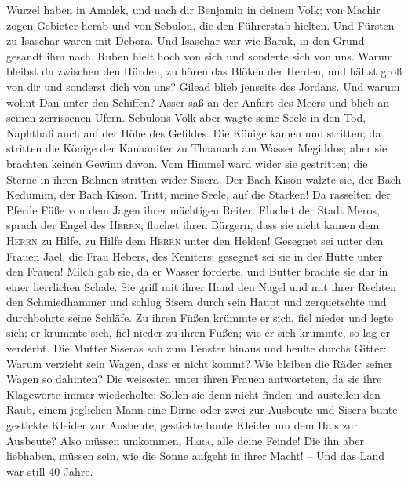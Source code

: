 Wurzel haben in Amalek, und nach dir Benjamin in deinem Volk; von Machir
zogen Gebieter herab und von Sebulon, die den Führerstab hielten.
 Und Fürsten zu Isaschar waren mit Debora. Und Isaschar
war wie Barak, in den Grund gesandt ihm nach. Ruben hielt hoch von sich
und sonderte sich von uns.  Warum bleibst du zwischen den
Hürden, zu hören das Blöken der Herden, und hältst groß von dir und
sonderst dich von uns?  Gilead blieb jenseits des
Jordans. Und warum wohnt Dan unter den Schiffen? Asser saß an der Anfurt
des Meers und blieb an seinen zerrissenen Ufern. 
Sebulons Volk aber wagte seine Seele in den Tod, Naphthali auch auf der
Höhe des Gefildes.  Die Könige kamen und stritten; da
stritten die Könige der Kanaaniter zu Thaanach am Wasser Megiddos; aber
sie brachten keinen Gewinn davon.  Vom Himmel ward wider
sie gestritten; die Sterne in ihren Bahnen stritten wider Sisera.
 Der Bach Kison wälzte sie, der Bach Kedumim, der Bach
Kison. Tritt, meine Seele, auf die Starken!  Da rasselten
der Pferde Füße von dem Jagen ihrer mächtigen Reiter. 
Fluchet der Stadt Meros, sprach der Engel des \textsc{Herrn}; fluchet
ihren Bürgern, dass sie nicht kamen dem \textsc{Herrn} zu Hilfe, zu
Hilfe dem \textsc{Herrn} unter den Helden!  Gesegnet sei
unter den Frauen Jael, die Frau Hebers, des Keniters; gesegnet sei sie
in der Hütte unter den Frauen!  Milch gab sie, da er
Wasser forderte, und Butter brachte sie dar in einer herrlichen Schale.
 Sie griff mit ihrer Hand den Nagel und mit ihrer Rechten
den Schmiedhammer und schlug Sisera durch sein Haupt und zerquetschte
und durchbohrte seine Schläfe.  Zu ihren Füßen krümmte er
sich, fiel nieder und legte sich; er krümmte sich, fiel nieder zu ihren
Füßen; wie er sich krümmte, so lag er verderbt.  Die
Mutter Siseras sah zum Fenster hinaus und heulte durchs Gitter: Warum
verzieht sein Wagen, dass er nicht kommt? Wie bleiben die Räder seiner
Wagen so dahinten?  Die weisesten unter ihren Frauen
antworteten, da sie ihre Klageworte immer wiederholte: 
Sollen sie denn nicht finden und austeilen den Raub, einem jeglichen
Mann eine Dirne oder zwei zur Ausbeute und Sisera bunte gestickte
Kleider zur Ausbeute, gestickte bunte Kleider um dem Hals zur Ausbeute?
 Also müssen umkommen, \textsc{Herr}, alle deine Feinde!
Die ihn aber liebhaben, müssen sein, wie die Sonne aufgeht in ihrer
Macht! -- Und das Land war still 40 Jahre.

